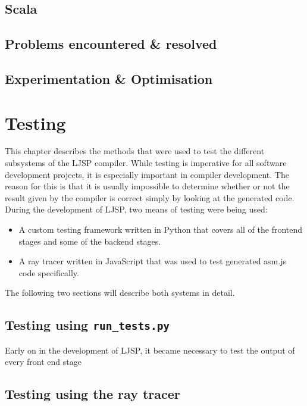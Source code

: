 \documentclass[11pt]{report}
\begin{document}
\section{Scala}
\section{Problems encountered \& resolved}
\section{Experimentation \& Optimisation}

\chapter{Testing}
This chapter describes the methods that were used to test the different subsystems of the LJSP compiler. While testing is imperative for all software development projects, it is especially important in compiler development. The reason for this is that it is usually impossible to determine whether or not the result given by the compiler is correct simply by looking at the generated code. \\

During the development of LJSP, two means of testing were being used:
\begin{itemize}
\item A custom testing framework written in Python that covers all of the frontend stages and some of the backend stages.
\item A ray tracer written in JavaScript that was used to test generated asm.js code specifically.
\end{itemize}
The following two sections will describe both systems in detail.

\section{Testing using \texttt{run_tests.py}}
Early on in the development of LJSP, it became necessary to test the output of every front end stage 
\section{Testing using the ray tracer}
\end{document}
